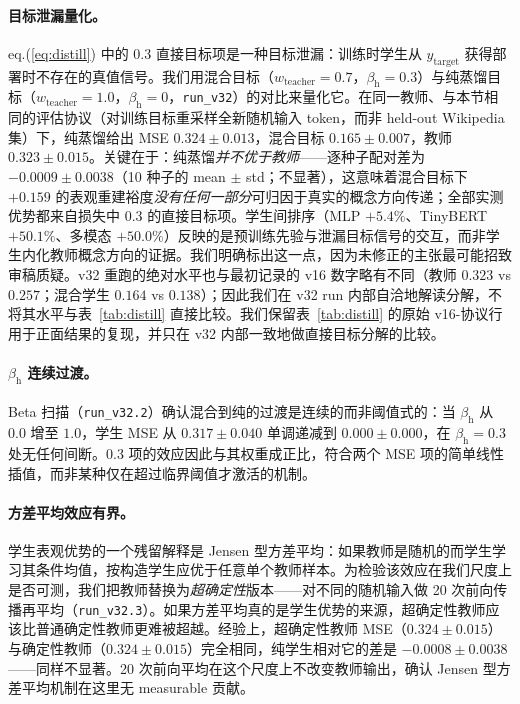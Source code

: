 \documentclass[10pt,twoside]{article}
\begin{document}
\paragraph{目标泄漏量化。}
eq.(\ref{eq:distill}) 中的 $0.3$ 直接目标项是一种目标泄漏：训练时学生从 $y_{\text{target}}$ 获得部署时不存在的真值信号。我们用混合目标（$w_{\text{teacher}}=0.7$，$\beta_{\text{h}}=0.3$）与纯蒸馏目标（$w_{\text{teacher}}=1.0$，$\beta_{\text{h}}=0$，\texttt{run\_v32}）的对比来量化它。在同一教师、与本节相同的评估协议（对训练目标重采样全新随机输入 token，而非 held-out Wikipedia 集）下，纯蒸馏给出 MSE $0.324 \pm 0.013$，混合目标 $0.165 \pm 0.007$，教师 $0.323 \pm 0.015$。关键在于：纯蒸馏\emph{并不优于教师}——逐种子配对差为 $-0.0009 \pm 0.0038$（10 种子的 mean $\pm$ std；不显著），这意味着混合目标下 $+0.159$ 的表观重建裕度\emph{没有任何一部分}可归因于真实的概念方向传递；全部实测优势都来自损失中 $0.3$ 的直接目标项。学生间排序（MLP $+5.4\%$、TinyBERT $+50.1\%$、多模态 $+50.0\%$）反映的是预训练先验与泄漏目标信号的交互，而非学生内化教师概念方向的证据。我们明确标出这一点，因为未修正的主张最可能招致审稿质疑。v32 重跑的绝对水平也与最初记录的 v16 数字略有不同（教师 $0.323$ vs $0.257$；混合学生 $0.164$ vs $0.138$）；因此我们在 v32 run 内部自洽地解读分解，不将其水平与表~\ref{tab:distill} 直接比较。我们保留表~\ref{tab:distill} 的原始 v16-协议行用于正面结果的复现，并只在 v32 内部一致地做直接目标分解的比较。

\paragraph{$\beta_{\text{h}}$ 连续过渡。}
Beta 扫描（\texttt{run\_v32.2}）确认混合到纯的过渡是连续的而非阈值式的：当 $\beta_{\text{h}}$ 从 $0.0$ 增至 $1.0$，学生 MSE 从 $0.317 \pm 0.040$ 单调递减到 $0.000 \pm 0.000$，在 $\beta_{\text{h}}=0.3$ 处无任何间断。$0.3$ 项的效应因此与其权重成正比，符合两个 MSE 项的简单线性插值，而非某种仅在超过临界阈值才激活的机制。

\paragraph{方差平均效应有界。}
学生表观优势的一个残留解释是 Jensen 型方差平均：如果教师是随机的而学生学习其条件均值，按构造学生应优于任意单个教师样本。为检验该效应在我们尺度上是否可测，我们把教师替换为\emph{超确定性}版本——对不同的随机输入做 20 次前向传播再平均（\texttt{run\_v32.3}）。如果方差平均真的是学生优势的来源，超确定性教师应该比普通确定性教师更难被超越。经验上，超确定性教师 MSE（$0.324 \pm 0.015$）与确定性教师（$0.324 \pm 0.015$）完全相同，纯学生相对它的差是 $-0.0008 \pm 0.0038$——同样不显著。20 次前向平均在这个尺度上不改变教师输出，确认 Jensen 型方差平均机制在这里无 measurable 贡献。
\end{document}

